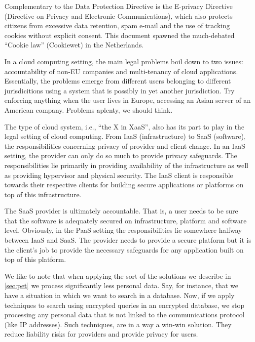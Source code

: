 \documentclass[11pt, a4paper]{article}
\begin{document}
Complementary to the Data Protection Directive is the E-privacy Directive (Directive on Privacy and Electronic Communications), which also protects citizens from excessive data retention, spam e-mail and the use of tracking cookies without explicit consent.
This document spawned the much-debated ``Cookie law'' (Cookiewet) in the Netherlands.

In a cloud computing setting, the main legal problems boil down to two issues: accountability of non-EU companies and multi-tenancy of cloud applications. Essentially, the problems emerge from different users belonging to different jurisdicitions using a system that is possibly in yet another jurisdiction. Try enforcing anything when the user lives in Europe, accessing an Asian server of an American company. Problems aplenty, we should think.

The type of cloud system, i.e., ``the X in XaaS'', also has its part to play in the legal setting of cloud computing.
From IaaS (infrastructure) to SaaS (software), the responsibilities concerning privacy of provider and client change.
In an IaaS setting, the provider can only do so much to provide privacy safeguards.
The responsibilities lie primarily in providing availability of the infrastructure as well as providing hypervisor and physical security.
The IaaS client is responsible towards their respective clients for building secure applications or platforms on top of this infrastructure.

The SaaS provider is ultimately accountable.
That is, a user needs to be sure that the software is adequately secured on infrastructure, platform and software level.
Obviously, in the PaaS setting the responsibilities lie somewhere halfway between IaaS and SaaS. The provider needs to provide a secure platform but it is the client's job to provide the necessary safeguards for any application built on top of this platform.

We like to note that when applying the sort of the solutions we describe in \autoref{sec:pet} we process significantly less personal data. Say, for instance, that we have a situation in which we want to search in a database. Now, if we apply techniques to search using encrypted queries in an encrypted database, we stop processing any personal data that is not linked to the communications protocol (like IP addresses). Such techniques, are in a way a win-win solution. They reduce liability risks for providers and provide privacy for users.
\end{document}
